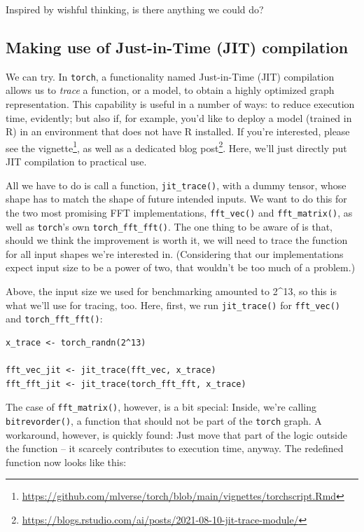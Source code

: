 \documentclass[
  letterpaper,
]{krantz}
\DeclareRobustCommand{\href}[2]{#2\footnote{\url{#1}}}
\begin{document}
Inspired by wishful thinking, is there anything we could do?

\hypertarget{making-use-of-just-in-time-jit-compilation}{%
\subsection{\texorpdfstring{Making use of Just-in-Time (JIT)
compilation}{Making use of Just-in-Time (JIT) compilation}}\label{making-use-of-just-in-time-jit-compilation}}

We can try. In \texttt{torch}, a functionality named Just-in-Time (JIT)
compilation allows us to \emph{trace} a function, or a model, to obtain
a highly optimized graph representation. This capability is useful in a
number of ways: to reduce execution time, evidently; but also if, for
example, you'd like to deploy a model (trained in R) in an environment
that does not have R installed. If you're interested, please see the
\href{https://github.com/mlverse/torch/blob/main/vignettes/torchscript.Rmd}{vignette},
as well as a dedicated
\href{https://blogs.rstudio.com/ai/posts/2021-08-10-jit-trace-module/}{blog
post}. Here, we'll just directly put JIT compilation to practical use.

All we have to do is call a function, \texttt{jit\_trace()}, with a
dummy tensor, whose shape has to match the shape of future intended
inputs. We want to do this for the two most promising FFT
implementations, \texttt{fft\_vec()} and \texttt{fft\_matrix()}, as well
as \texttt{torch}'s own \texttt{torch\_fft\_fft()}. The one thing to be
aware of is that, should we think the improvement is worth it, we will
need to trace the function for all input shapes we're interested in.
(Considering that our implementations expect input size to be a power of
two, that wouldn't be too much of a problem.)

Above, the input size we used for benchmarking amounted to 2\^{}13, so
this is what we'll use for tracing, too. Here, first, we run
\texttt{jit\_trace()} for \texttt{fft\_vec()} and
\texttt{torch\_fft\_fft()}:

\begin{verbatim}
x_trace <- torch_randn(2^13)

fft_vec_jit <- jit_trace(fft_vec, x_trace)
fft_fft_jit <- jit_trace(torch_fft_fft, x_trace)
\end{verbatim}

The case of \texttt{fft\_matrix()}, however, is a bit special: Inside,
we're calling \texttt{bitrevorder()}, a function that should not be part
of the \texttt{torch} graph. A workaround, however, is quickly found:
Just move that part of the logic outside the function -- it scarcely
contributes to execution time, anyway. The redefined function now looks
like this:
\end{document}
